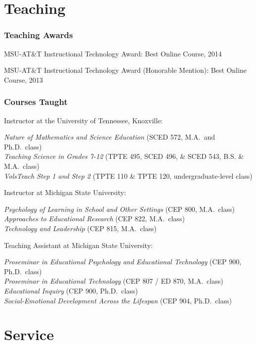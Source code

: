 \documentclass[
  14,
]{article}
\begin{document}
\hypertarget{teaching}{%
\section{Teaching}\label{teaching}}

\hypertarget{teaching-awards}{%
\subsubsection{Teaching Awards}\label{teaching-awards}}

MSU-AT\&T Instructional Technology Award: Best Online Course, 2014

MSU-AT\&T Instructional Technology Award (Honorable Mention): Best
Online Course, 2013

\hypertarget{courses-taught}{%
\subsubsection{Courses Taught}\label{courses-taught}}

Instructor at the University of Tennessee, Knoxville:

\emph{Nature of Mathematics and Science Education} (SCED 572, M.A.~and
Ph.D.~class)\\
\emph{Teaching Science in Grades 7-12} (TPTE 495, SCED 496, \& SCED 543,
B.S. \& M.A.~class)\\
\emph{VolsTeach Step 1 and Step 2} (TPTE 110 \& TPTE 120,
undergraduate-level class)

Instructor at Michigan State University:

\emph{Psychology of Learning in School and Other Settings} (CEP 800,
M.A.~class)\\
\emph{Approaches to Educational Research} (CEP 822, M.A.~class)\\
\emph{Technology and Leadership} (CEP 815, M.A.~class)

Teaching Assistant at Michigan State University:

\emph{Proseminar in Educational Psychology and Educational Technology}
(CEP 900, Ph.D.~class)\\
\emph{Proseminar in Educational Technology} (CEP 807 / ED 870,
M.A.~class)\\
\emph{Educational Inquiry} (CEP 900, Ph.D.~class)\\
\emph{Social-Emotional Development Across the Lifespan} (CEP 904,
Ph.D.~class)

\hypertarget{service}{%
\section{Service}\label{service}}
\end{document}
